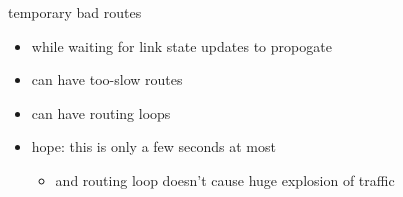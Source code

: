 \begin{frame}{temporary bad routes}
    \begin{itemize}
    \item while waiting for link state updates to propogate
    \item can have too-slow routes
    \item can have routing loops
    \vspace{.5cm}
    \item hope: this is only a few seconds at most
        \begin{itemize}
        \item and routing loop doesn't cause huge explosion of traffic
        \end{itemize}
    \end{itemize}
\end{frame}
